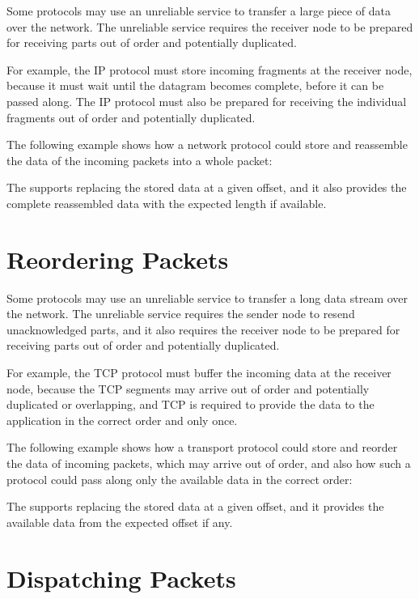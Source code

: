 Some protocols may use an unreliable service to transfer a large piece of data
over the network. The unreliable service requires the receiver node to be
prepared for receiving parts out of order and potentially duplicated.

For example, the IP protocol must store incoming fragments at the receiver node,
because it must wait until the datagram becomes complete, before it can be
passed along. The IP protocol must also be prepared for receiving the individual
fragments out of order and potentially duplicated.

The following example shows how a network protocol could store and reassemble
the data of the incoming packets into a whole packet:


The  supports replacing the stored data at a given
offset, and it also provides the complete reassembled data with the expected
length if available.

\section{Reordering Packets}

Some protocols may use an unreliable service to transfer a long data stream over
the network. The unreliable service requires the sender node to resend
unacknowledged parts, and it also requires the receiver node to be prepared for
receiving parts out of order and potentially duplicated.

For example, the TCP protocol must buffer the incoming data at the receiver
node, because the TCP segments may arrive out of order and potentially
duplicated or overlapping, and TCP is required to provide the data to the
application in the correct order and only once.

The following example shows how a transport protocol could store and reorder the
data of incoming packets, which may arrive out of order, and also how such a
protocol could pass along only the available data in the correct order:


The  supports replacing the stored data at a given
offset, and it provides the available data from the expected offset if any.

\section{Dispatching Packets}

